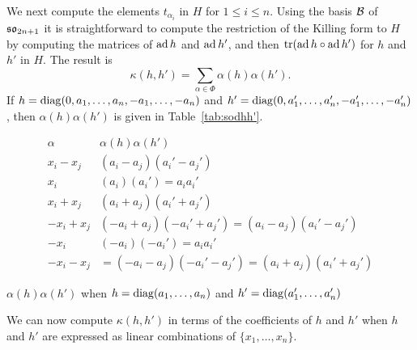 We next compute the elements $t_{\alpha_i}$ in $H$ for $1\leq i\leq
n$. Using the basis ${\mathcal B}$ of $\mathfrak {so}_{2n+1}$ it is straightforward to compute
the restriction of the Killing form to $H$ by computing the matrices of $\operatorname{ad}
h$ and $\operatorname{ad} h'$, and then ${\operatorname{tr}}(\operatorname{ad} h\circ \operatorname{ad} h')$ for $h$ and $h'$ in
$H$. The result is
\[
\kappa(h,h')= \sum_{\alpha\in \Phi} \alpha(h) \alpha(h').
\]
If $h={\operatorname{diag}(0,a_1,\dots,a_n, -a_1,\dots,-a_n)}$ and $h'={\operatorname{diag}(0,a'_1,\dots,a'_n, -a'_1,\dots,-a'_n)}$, then
$\alpha(h) \alpha(h')$ is given in Table~\ref{tab:sodhh'}.

\begin{table}[h!tb]
  \small {}
  \renewcommand{\arraystretch}{1.3}
  \begin{equation*}
    \begin{array}{c|c}
      \alpha&\alpha(h) \alpha(h')\\\hline
      x_i-x_j& (a_i-a_j)(a_i'-a_j')\\
      x_i&(a_i)(a_i')= a_ia_i'\\ 
      x_i+x_j&(a_i+a_j)(a_i'+a_j')\\ 
      - x_i+x_j&(-a_i+a_j)(-a_i'+a_j')=(a_i-a_j)(a_i'-a_j')\\
      -x_i &(-a_i)(-a_i')=a_ia_i'\\ 
      -x_i-x_j&=(-a_i-a_j)(-a_i'-a_j')=(a_i+a_j)(a_i'+a_j') 
    \end{array}  
  \end{equation*}
  \caption{$\alpha(h) \alpha(h')$ when $h={\operatorname{diag}(a_1,\dots,a_n)}$ and
    $h'={\operatorname{diag}(a'_1,\dots,a'_n)}$}\label{tab:sodhh'}  
\end{table}

We can now compute $\kappa(h,h')$ in terms of the coefficients of $h$ and
$h'$ when $h$ and $h'$ are expressed as linear combinations of $\{x_1,
\dots, x_n\}$. 

